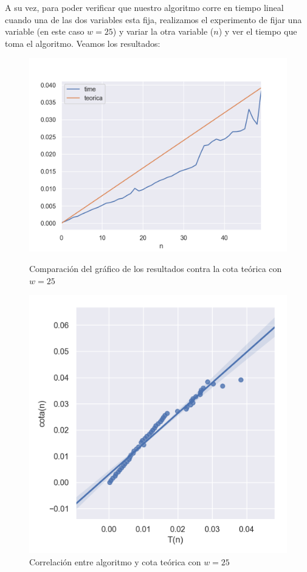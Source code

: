 A su vez, para poder verificar que nuestro algoritmo corre en tiempo lineal cuando una de las dos variables esta fija, realizamos el experimento de fijar una variable (en este caso $w=25$) y variar la otra variable ($n$) y ver el tiempo que toma el algoritmo. Veamos los resultados:

\begin{figure}[H]
   \begin{minipage}{0.5\textwidth}
     \centering
     \includegraphics[width=1\linewidth]{img/fijo_w_1}
     \caption{Comparación del gráfico de los resultados contra la cota teórica con $w=25$}
   \end{minipage}\hfill
   \begin{minipage}{0.5\textwidth}
     \centering
     \includegraphics[width=1\linewidth]{img/fijo_w_2}
     \caption{Correlación entre algoritmo y cota teórica con $w=25$}
   \end{minipage}
\end{figure}



